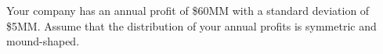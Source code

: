 \documentclass[answers,11pt]{exam}
\begin{document}
\begin{questions}
\begin{parts}

\end{parts}

%
%
%
%
%
%
%
%


\newpage


\question Your company has an annual profit of \$60MM with a standard
deviation of \$5MM.  Assume that the distribution of your annual profits is
symmetric and mound-shaped.

\end{questions}
\end{document}
